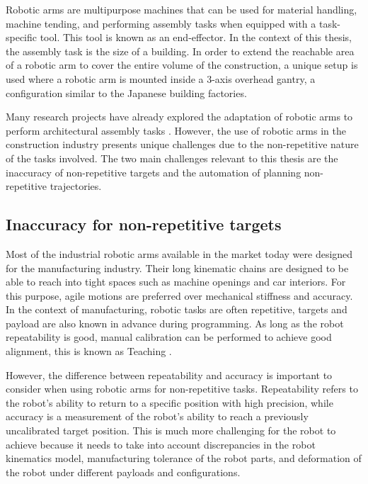 Robotic arms are multipurpose machines that can be used for material handling, machine tending, and performing assembly tasks when equipped with a task-specific tool. This tool is known as an end-effector. In the context of this thesis, the assembly task is the size of a building. In order to extend the reachable area of a robotic arm to cover the entire volume of the construction, a unique setup is used where a robotic arm is mounted inside a 3-axis overhead gantry, a configuration similar to the Japanese building factories.

Many research projects have already explored the adaptation of robotic arms to perform architectural assembly tasks . However, the use of robotic arms in the construction industry presents unique challenges due to the non-repetitive nature of the tasks involved. The two main challenges relevant to this thesis are the inaccuracy of non-repetitive targets and the automation of planning non-repetitive trajectories.

\subsection{Inaccuracy for non-repetitive targets}
\label{subsection:introduction_inaccuracy_for_non_repetitive_targets}

Most of the industrial robotic arms available in the market today were designed for the manufacturing industry. Their long kinematic chains are designed to be able to reach into tight spaces such as machine openings and car interiors. For this purpose, agile motions are preferred over mechanical stiffness and accuracy. In the context of manufacturing, robotic tasks are often repetitive, targets and payload are also known in advance during programming. As long as the robot repeatability is good, manual calibration can be performed to achieve good alignment, this is known as Teaching  \parencite{shohamRobotTeachingMethods1984}.

However, the difference between repeatability and accuracy is important to consider when using robotic arms for non-repetitive tasks. Repeatability refers to the robot's ability to return to a specific position with high precision, while accuracy is a measurement of the robot's ability to reach a previously uncalibrated target position. This is much more challenging for the robot to achieve because it needs to take into account discrepancies in the robot kinematics model, manufacturing tolerance of the robot parts, and deformation of the robot under different payloads and configurations. 

